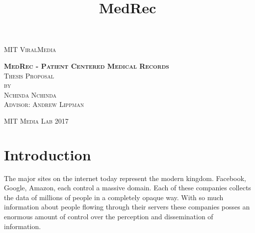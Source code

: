 \documentclass[a4paper]{article}
\begin{document}
\doublespacing
\title{MedRec}

\begin{titlepage}
\begin{center}

\textsc{\Large MIT ViralMedia}\\[4em]

\vspace{4em}

\textsc{\huge \textbf{MedRec - Patient Centered Medical Records}}\\[4em]

\textsc{\large Thesis Proposal}\\[1em]

\textsc{by}\\[1em]

\textsc{\Large Nchinda Nchinda}\\[1em]

\textsc{\large Advisor: Andrew Lippman}

\end{center}

\vspace*{\fill}
\textsc{MIT Media Lab\hspace*{\fill} 2017}

\end{titlepage}
\begin{comment}

\begin{center}
{\large\bf{Abstract\\}}
\end{center}
abstract stuff
\end{comment}

\tableofcontents\label{c}
\newpage


\section{Introduction}
The major sites on the internet today represent the modern kingdom. Facebook, Google, Amazon, each control a massive domain. Each of these companies collects the data of millions of people in a completely opaque way. With so much information about people flowing through their servers these companies posses an enormous amount of control over the perception and dissemination of information.
\end{document}
